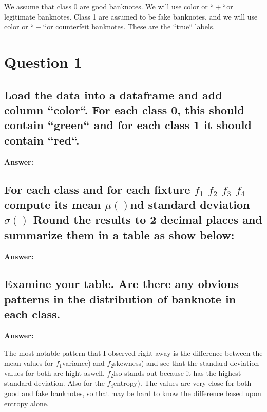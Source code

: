 \documentclass[12pt, a4paper]{extarticle}
\newcommand{\answer}[1]{\textbf{Answer: }\par#1}
\newcommand{\var}[1]{\texorpdfstring{#1}\xspace}
\newcommand{\fixture}[1]{\texorpdfstring{\ensuremath{f_{#1}}}\xspace}
\newcommand{\fmu}[1]{\texorpdfstring{\ensuremath{\mu({#1})}}\xspace}
\newcommand{\fsigma}[1]{\texorpdfstring{\ensuremath{\sigma({#1})}}\xspace}
\begin{document}
    We assume that class 0 are good banknotes.
    We will use color  or \var{$``+``$} for legitimate banknotes.
    Class 1 are assumed to be fake banknotes, and we will use color  or \var{$``-``$} for counterfeit banknotes.
    These are the ``true`` labels.

    \newpage

    \pagestyle{pages}



    \section{Question 1} \label{sec:question1}

    \subsection{Load the data into a dataframe and add column ``color``. For each class 0, this should contain ``green`` and for each class 1 it should contain ``red``.} \label{subsec:question1.1}

    \answer{}

    \subsection{For each class and for each fixture \fixture{1}, \fixture{2}, \fixture{3}, \fixture{4}, compute its mean \fmu{} and standard deviation \fsigma{}. Round the results to 2 decimal places and summarize them in a table as show below:} \label{subsec:question1.2}

    \answer{}

    \subsection{Examine your table. Are there any obvious patterns in the distribution of banknote in each class.} \label{subsec:question1.3}

    \answer{The most notable pattern that I observed right away is the difference between the mean values for \fixture{1} (variance) and \fixture{2} (skewness) and see that the standard deviation values for both are hight aswell. \fixture{2} also stands out because it has the highest standard deviation. Also for the \fixture{4} (entropy). The values are very close for both good and fake banknotes, so that may be hard to know the difference based upon entropy alone.}
\end{document}
